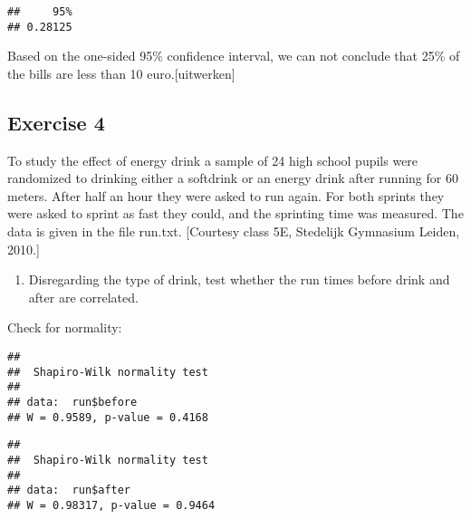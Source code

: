 \documentclass[
]{article}
\newenvironment{Shaded}{\begin{snugshade}}{\end{snugshade}}
\newcommand{\CommentTok}[1]{\textcolor[rgb]{0.56,0.35,0.01}{\textit{#1}}}
\newcommand{\FunctionTok}[1]{\textcolor[rgb]{0.00,0.00,0.00}{#1}}
\newcommand{\NormalTok}[1]{#1}
\newcommand{\SpecialCharTok}[1]{\textcolor[rgb]{0.00,0.00,0.00}{#1}}
\providecommand{\tightlist}{%
  \setlength{\itemsep}{0pt}\setlength{\parskip}{0pt}}
\begin{document}
\begin{verbatim}
##     95% 
## 0.28125
\end{verbatim}

Based on the one-sided 95\% confidence interval, we can not conclude
that 25\% of the bills are less than 10 euro.{[}uitwerken{]}

\hypertarget{exercise-4}{%
\subsection{Exercise 4}\label{exercise-4}}

To study the effect of energy drink a sample of 24 high school pupils
were randomized to drinking either a softdrink or an energy drink after
running for 60 meters. After half an hour they were asked to run again.
For both sprints they were asked to sprint as fast they could, and the
sprinting time was measured. The data is given in the file run.txt.
{[}Courtesy class 5E, Stedelijk Gymnasium Leiden, 2010.{]}

\begin{enumerate}
\def\labelenumi{\alph{enumi})}
\tightlist
\item
  Disregarding the type of drink, test whether the run times before
  drink and after are correlated.
\end{enumerate}

Check for normality:

\begin{Shaded}
\end{Shaded}

\begin{verbatim}
## 
##  Shapiro-Wilk normality test
## 
## data:  run$before
## W = 0.9589, p-value = 0.4168
\end{verbatim}

\begin{Shaded}
\end{Shaded}

\begin{verbatim}
## 
##  Shapiro-Wilk normality test
## 
## data:  run$after
## W = 0.98317, p-value = 0.9464
\end{verbatim}
\end{document}
